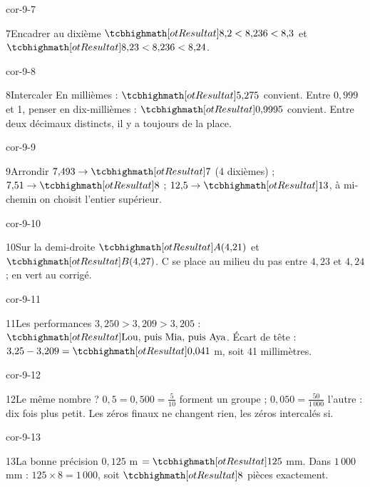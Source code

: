 \begin{blocLivre}{cor-9-7}\begin{corrige}{7}{Encadrer au dixième}
$\res{8{,}2<8{,}236<8{,}3}$ et $\res{8{,}23<8{,}236<8{,}24}$.
\end{corrige}\end{blocLivre}
\begin{blocLivre}{cor-9-8}\begin{corrige}{8}{Intercaler}
En millièmes : $\res{5{,}275}$ convient. Entre $0{,}999$ et 1, penser en dix-millièmes : $\res{0{,}9995}$ convient. Entre deux décimaux distincts, il y a toujours de la place.
\end{corrige}\end{blocLivre}
\begin{blocLivre}{cor-9-9}\begin{corrige}{9}{Arrondir}
$7{,}493\to\res7$ (4 dixièmes) ; $7{,}51\to\res8$ ; $12{,}5\to\res{13}$, à mi-chemin on choisit l’entier supérieur.
\end{corrige}\end{blocLivre}
\begin{blocLivre}{cor-9-10}\begin{corrige}{10}{Sur la demi-droite}
$\res{A(4{,}21)}$ et $\res{B(4{,}27)}$. C se place au milieu du pas entre $4{,}23$ et $4{,}24$ ; en vert au corrigé.
\label{fig-cor-9-10}
\end{corrige}\end{blocLivre}
\begin{blocLivre}{cor-9-11}\begin{corrige}{11}{Les performances}
$3{,}250>3{,}209>3{,}205$ : $\res{\text{Lou, puis Mia, puis Aya}}$. Écart de tête : $3{,}25-3{,}209=\res{0{,}041}$ m, soit 41 millimètres.
\end{corrige}\end{blocLivre}
\begin{blocLivre}{cor-9-12}\begin{corrige}{12}{Le même nombre ?}
$0{,}5=0{,}500=\frac5{10}$ forment un groupe ; $0{,}050=\frac{50}{1\,000}$ l’autre : dix fois plus petit. Les zéros finaux ne changent rien, les zéros intercalés si.
\end{corrige}\end{blocLivre}
\begin{blocLivre}{cor-9-13}\begin{corrige}{13}{La bonne précision}
$0{,}125$ m $=\res{125}$ mm. Dans $1\,000$ mm : $125\times8=1\,000$, soit $\res8$ pièces exactement.
\end{corrige}\end{blocLivre}
